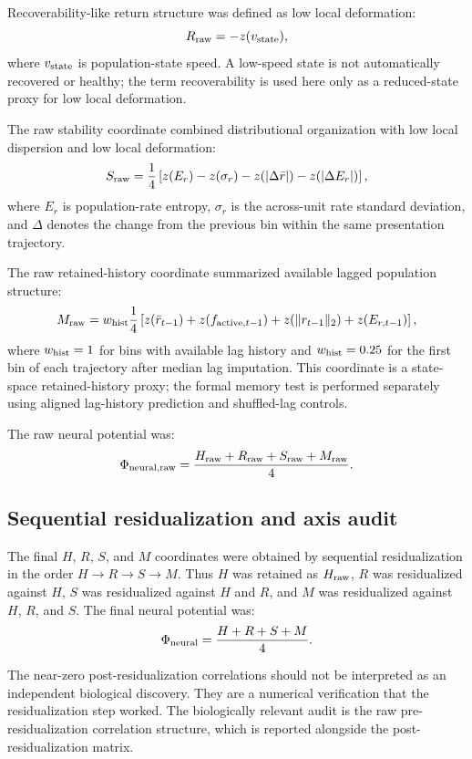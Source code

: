 \documentclass[11pt]{article}
\begin{document}
Recoverability-like return structure was defined as low local deformation:
\[
R_{\rm raw} = -z(v_{\rm state}),
\]
where \(v_{\rm state}\) is population-state speed. A low-speed state is not automatically recovered or healthy; the term recoverability is used here only as a reduced-state proxy for low local deformation.

The raw stability coordinate combined distributional organization with low local dispersion and low local deformation:
\[
S_{\rm raw}
=
\frac{1}{4}
\left[
z(E_r)
-
z(\sigma_r)
-
z(|\Delta \bar r|)
-
z(|\Delta E_r|)
\right],
\]
where \(E_r\) is population-rate entropy, \(\sigma_r\) is the across-unit rate standard deviation, and \(\Delta\) denotes the change from the previous bin within the same presentation trajectory.

The raw retained-history coordinate summarized available lagged population structure:
\[
M_{\rm raw}
=
w_{\rm hist}
\frac{1}{4}
\left[
z(\bar r_{t-1})
+
z(f_{{\rm active},t-1})
+
z(\lVert r_{t-1}\rVert_2)
+
z(E_{r,t-1})
\right],
\]
where \(w_{\rm hist}=1\) for bins with available lag history and \(w_{\rm hist}=0.25\) for the first bin of each trajectory after median lag imputation. This coordinate is a state-space retained-history proxy; the formal memory test is performed separately using aligned lag-history prediction and shuffled-lag controls.

The raw neural potential was:
\[
\Phi_{{\rm neural,raw}}
=
\frac{H_{\rm raw}+R_{\rm raw}+S_{\rm raw}+M_{\rm raw}}{4}.
\]

\subsection{Sequential residualization and axis audit}

The final \(H\), \(R\), \(S\), and \(M\) coordinates were obtained by sequential residualization in the order \(H \rightarrow R \rightarrow S \rightarrow M\). Thus \(H\) was retained as \(H_{\rm raw}\), \(R\) was residualized against \(H\), \(S\) was residualized against \(H\) and \(R\), and \(M\) was residualized against \(H\), \(R\), and \(S\). The final neural potential was:
\[
\Phi_{\rm neural}
=
\frac{H+R+S+M}{4}.
\]

The near-zero post-residualization correlations should not be interpreted as an independent biological discovery. They are a numerical verification that the residualization step worked. The biologically relevant audit is the raw pre-residualization correlation structure, which is reported alongside the post-residualization matrix.
\end{document}
